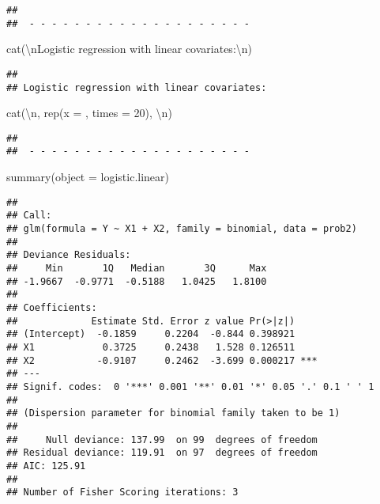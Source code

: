 \documentclass[
]{article}
\newenvironment{Shaded}{\begin{snugshade}}{\end{snugshade}}
\newcommand{\AttributeTok}[1]{\textcolor[rgb]{0.77,0.63,0.00}{#1}}
\newcommand{\DecValTok}[1]{\textcolor[rgb]{0.00,0.00,0.81}{#1}}
\newcommand{\FunctionTok}[1]{\textcolor[rgb]{0.00,0.00,0.00}{#1}}
\newcommand{\NormalTok}[1]{#1}
\newcommand{\SpecialCharTok}[1]{\textcolor[rgb]{0.00,0.00,0.00}{#1}}
\newcommand{\StringTok}[1]{\textcolor[rgb]{0.31,0.60,0.02}{#1}}
\begin{document}
\begin{verbatim}
## 
##  - - - - - - - - - - - - - - - - - - - -
\end{verbatim}

\begin{Shaded}
\begin{Highlighting}[]
\FunctionTok{cat}\NormalTok{(}\StringTok{\textquotesingle{}}\SpecialCharTok{\textbackslash{}n}\StringTok{Logistic regression with linear covariates:}\SpecialCharTok{\textbackslash{}n}\StringTok{\textquotesingle{}}\NormalTok{)}
\end{Highlighting}
\end{Shaded}

\begin{verbatim}
## 
## Logistic regression with linear covariates:
\end{verbatim}

\begin{Shaded}
\begin{Highlighting}[]
\FunctionTok{cat}\NormalTok{(}\StringTok{\textquotesingle{}}\SpecialCharTok{\textbackslash{}n}\StringTok{\textquotesingle{}}\NormalTok{, }\FunctionTok{rep}\NormalTok{(}\AttributeTok{x =} \StringTok{\textquotesingle{}{-}\textquotesingle{}}\NormalTok{, }\AttributeTok{times =} \DecValTok{20}\NormalTok{), }\StringTok{\textquotesingle{}}\SpecialCharTok{\textbackslash{}n}\StringTok{\textquotesingle{}}\NormalTok{)}
\end{Highlighting}
\end{Shaded}

\begin{verbatim}
## 
##  - - - - - - - - - - - - - - - - - - - -
\end{verbatim}

\begin{Shaded}
\begin{Highlighting}[]
\FunctionTok{summary}\NormalTok{(}\AttributeTok{object =}\NormalTok{ logistic.linear)}
\end{Highlighting}
\end{Shaded}

\begin{verbatim}
## 
## Call:
## glm(formula = Y ~ X1 + X2, family = binomial, data = prob2)
## 
## Deviance Residuals: 
##     Min       1Q   Median       3Q      Max  
## -1.9667  -0.9771  -0.5188   1.0425   1.8100  
## 
## Coefficients:
##             Estimate Std. Error z value Pr(>|z|)    
## (Intercept)  -0.1859     0.2204  -0.844 0.398921    
## X1            0.3725     0.2438   1.528 0.126511    
## X2           -0.9107     0.2462  -3.699 0.000217 ***
## ---
## Signif. codes:  0 '***' 0.001 '**' 0.01 '*' 0.05 '.' 0.1 ' ' 1
## 
## (Dispersion parameter for binomial family taken to be 1)
## 
##     Null deviance: 137.99  on 99  degrees of freedom
## Residual deviance: 119.91  on 97  degrees of freedom
## AIC: 125.91
## 
## Number of Fisher Scoring iterations: 3
\end{verbatim}
\end{document}
